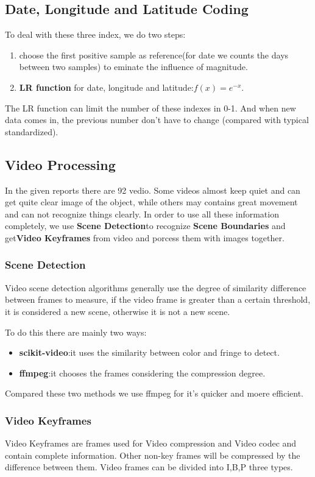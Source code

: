 \documentclass[12pt]{article}
\begin{document}
\subsection{Date, Longitude and Latitude Coding}
To deal with these three index, we do two steps:
\begin{enumerate}
	\item choose the first positive sample as reference(for date we counts the days between two samples) to eminate the influence of magnitude.
	\item \textbf{ LR function} for date, longitude and latitude:$f(x)=e^{-x}$.
	
\end{enumerate} 

The LR function can limit the number of these indexes in 0-1. And when new data comes in, the previous number don't have to change (compared with typical standardized).
\subsection{Video Processing}
In the given reports there are 92 vedio. Some videos almost keep quiet and can get quite clear image of the object, while others may contains great movement and can not recognize things clearly. In order to use all these information completely, we use \textbf{Scene Detection}to recognize \textbf{Scene Boundaries} and get\textbf{Video Keyframes} from video and porcess them with images together.

\subsubsection{Scene Detection}
Video scene detection algorithms generally use the degree of similarity difference between frames to measure, if the video frame is greater than a certain threshold, it is considered a new scene, otherwise it is not a new scene.

To do this there are mainly two ways:
\begin{itemize}
	\item \textbf{scikit-video}:it uses the similarity between color and fringe to detect.
	\item \textbf{ffmpeg}\cite{ffmpeg}:it chooses the frames considering the compression degree.
\end{itemize}
Compared these two methods we use ffmpeg for it's quicker and moere efficient.

\subsubsection{Video Keyframes}
Video Keyframes are frames used for Video compression and Video codec and contain complete information. Other non-key frames will be compressed by the difference between them. Video frames can be divided into I,B,P three types.
\end{document}
